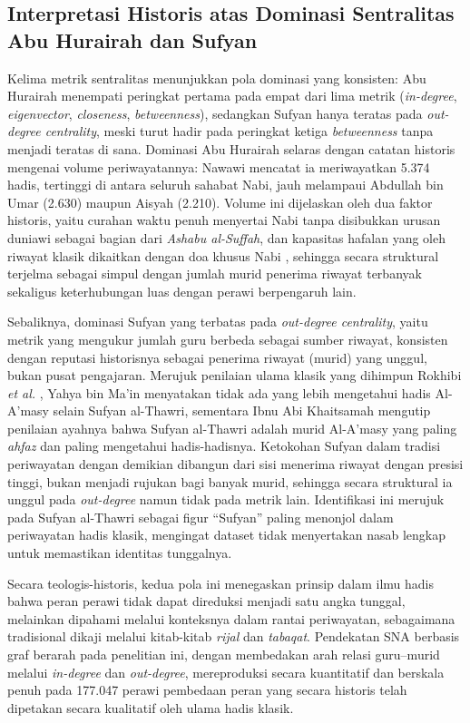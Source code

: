 \subsection{Interpretasi Historis atas Dominasi Sentralitas Abu Hurairah dan Sufyan}
\label{subsec:pembahasan-dominasi-struktural}

Kelima metrik sentralitas menunjukkan pola dominasi yang konsisten: Abu Hurairah menempati peringkat pertama pada empat dari lima metrik (\textit{in-degree}, \textit{eigenvector}, \textit{closeness}, \textit{betweenness}), sedangkan Sufyan hanya teratas pada \textit{out-degree centrality}, meski turut hadir pada peringkat ketiga \textit{betweenness} tanpa menjadi teratas di sana. Dominasi Abu Hurairah selaras dengan catatan historis mengenai volume periwayatannya: Nawawi \cite{Nawawi2024} mencatat ia meriwayatkan 5.374 hadis, tertinggi di antara seluruh sahabat Nabi, jauh melampaui Abdullah bin Umar (2.630) maupun Aisyah (2.210). Volume ini dijelaskan oleh dua faktor historis, yaitu curahan waktu penuh menyertai Nabi tanpa disibukkan urusan duniawi sebagai bagian dari \textit{Ashabu al-Suffah}, dan kapasitas hafalan yang oleh riwayat klasik dikaitkan dengan doa khusus Nabi \cite{Nawawi2024}, sehingga secara struktural terjelma sebagai simpul dengan jumlah murid penerima riwayat terbanyak sekaligus keterhubungan luas dengan perawi berpengaruh lain.

Sebaliknya, dominasi Sufyan yang terbatas pada \textit{out-degree centrality}, yaitu metrik yang mengukur jumlah guru berbeda sebagai sumber riwayat, konsisten dengan reputasi historisnya sebagai penerima riwayat (murid) yang unggul, bukan pusat pengajaran. Merujuk penilaian ulama klasik yang dihimpun Rokhibi \textit{et al.} \cite{Rokhibi2025}, Yahya bin Ma'in menyatakan tidak ada yang lebih mengetahui hadis Al-A'masy selain Sufyan al-Thawri, sementara Ibnu Abi Khaitsamah mengutip penilaian ayahnya bahwa Sufyan al-Thawri adalah murid Al-A'masy yang paling \textit{ahfaz} dan paling mengetahui hadis-hadisnya. Ketokohan Sufyan dalam tradisi periwayatan dengan demikian dibangun dari sisi menerima riwayat dengan presisi tinggi, bukan menjadi rujukan bagi banyak murid, sehingga secara struktural ia unggul pada \textit{out-degree} namun tidak pada metrik lain. Identifikasi ini merujuk pada Sufyan al-Thawri sebagai figur ``Sufyan'' paling menonjol dalam periwayatan hadis klasik, mengingat dataset tidak menyertakan nasab lengkap untuk memastikan identitas tunggalnya.

Secara teologis-historis, kedua pola ini menegaskan prinsip dalam ilmu hadis bahwa peran perawi tidak dapat direduksi menjadi satu angka tunggal, melainkan dipahami melalui konteksnya dalam rantai periwayatan, sebagaimana tradisional dikaji melalui kitab-kitab \textit{rijal} dan \textit{tabaqat}. Pendekatan SNA berbasis graf berarah pada penelitian ini, dengan membedakan arah relasi guru--murid melalui \textit{in-degree} dan \textit{out-degree}, mereproduksi secara kuantitatif dan berskala penuh pada 177.047 perawi pembedaan peran yang secara historis telah dipetakan secara kualitatif oleh ulama hadis klasik.

